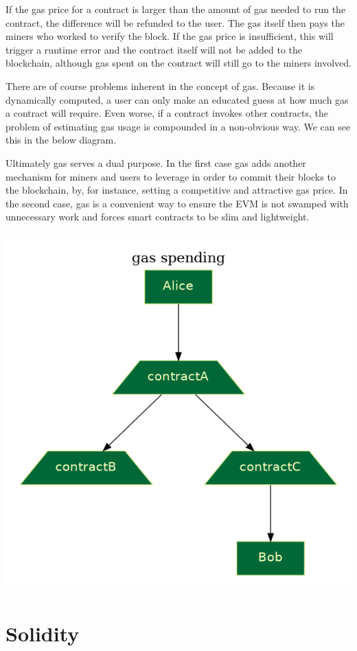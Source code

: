 \documentclass[twoside]{article}
\begin{document}
If the gas price for a contract is larger than the amount of gas needed to run
the contract, the difference will be refunded to the user.  The gas itself then
pays the miners who worked to verify the block.  If the gas price is
insufficient, this will trigger a runtime error and the contract itself will not
be added to the blockchain, although gas spent on the contract will still go to
the miners involved.

There are of course problems inherent in the concept of gas.  Because it is
dynamically computed, a user can only make an educated guess at how much gas a
contract will require.  Even worse, if a contract invokes other contracts, the
problem of estimating gas usage is compounded in a non-obvious way.  We can see
this in the below diagram.

Ultimately gas serves a dual purpose.  In the first case gas adds another
mechanism for miners and users to leverage in order to commit their blocks to
the blockchain, by, for instance, setting a competitive and attractive gas
price.  In the second case, gas is a convenient way to ensure the EVM is not
swamped with unnecessary work and forces smart contracts to be slim and
lightweight.  

\includegraphics[scale=0.35]{gas}

\section{Solidity}
\end{document}
